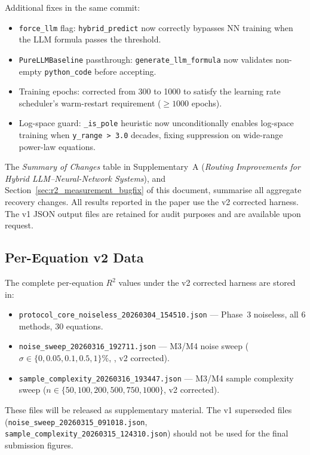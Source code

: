\documentclass[twoside,11pt]{article}
\begin{document}
Additional fixes in the same commit:
\begin{itemize}
  \item \texttt{force\_llm} flag: \texttt{hybrid\_predict} now correctly
    bypasses NN training when the LLM formula passes the threshold.
  \item \texttt{PureLLMBaseline} passthrough: \texttt{generate\_llm\_formula}
    now validates non-empty \texttt{python\_code} before accepting.
  \item Training epochs: corrected from 300 to 1000 to satisfy the learning
    rate scheduler's warm-restart requirement ($\geq\!1000$ epochs).
  \item Log-space guard: \texttt{\_is\_pole} heuristic now unconditionally
    enables log-space training when \texttt{y\_range > 3.0} decades,
    fixing suppression on wide-range power-law equations.
\end{itemize}

The \emph{Summary of Changes} table in Supplementary~A (\emph{Routing Improvements for Hybrid LLM--Neural-Network Systems}), and Section~\ref{sec:r2_measurement_bugfix} of this document, summarise all
aggregate recovery changes. All results reported in the paper use the
v2 corrected harness. The v1 JSON output files are retained for audit
purposes and are available upon request.

\subsection*{Per-Equation v2 Data}

The complete per-equation $R^2$ values under the v2 corrected harness are
stored in:
\begin{itemize}
  \item \texttt{protocol\_core\_noiseless\_20260304\_154510.json} —
    Phase~3 noiseless, all 6 methods, 30 equations.
  \item \texttt{noise\_sweep\_20260316\_192711.json} —
    M3/M4 noise sweep ($\sigma \in \{0, 0.05, 0.1, 0.5, 1\}\%$,
    , v2 corrected).
  \item \texttt{sample\_complexity\_20260316\_193447.json} —
    M3/M4 sample complexity sweep ($n \in \{50, 100, 200, 500, 750, 1000\}$,
    v2 corrected).
\end{itemize}
These files will be released as supplementary material. The v1 superseded
files (\texttt{noise\_sweep\_20260315\_091018.json},
\texttt{sample\_complexity\_20260315\_124310.json}) should not be used
for the final submission figures.
\end{document}
